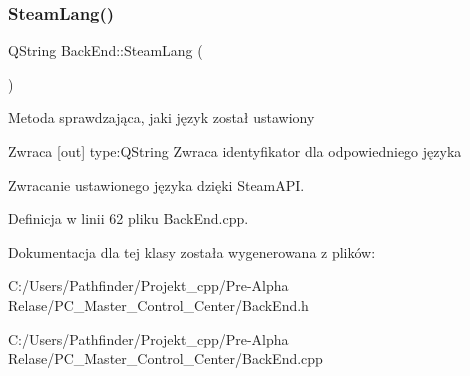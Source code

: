 \subsubsection{\texorpdfstring{Steam\+Lang()}{SteamLang()}}
{\footnotesize\ttfamily Q\+String Back\+End\+::\+Steam\+Lang (\begin{DoxyParamCaption}{ }\end{DoxyParamCaption})}

Metoda sprawdzająca, jaki język został ustawiony \begin{DoxyReturn}{Zwraca}
\mbox{[}out\mbox{]} type\+:Q\+String Zwraca identyfikator dla odpowiedniego języka 
\end{DoxyReturn}
Zwracanie ustawionego języka dzięki Steam\+A\+PI. 

Definicja w linii 62 pliku Back\+End.\+cpp.



Dokumentacja dla tej klasy została wygenerowana z plików\+:\begin{DoxyCompactItemize}
\item 
C\+:/\+Users/\+Pathfinder/\+Projekt\+\_\+cpp/\+Pre-\/\+Alpha Relase/\+P\+C\+\_\+\+Master\+\_\+\+Control\+\_\+\+Center/Back\+End.\+h\item 
C\+:/\+Users/\+Pathfinder/\+Projekt\+\_\+cpp/\+Pre-\/\+Alpha Relase/\+P\+C\+\_\+\+Master\+\_\+\+Control\+\_\+\+Center/Back\+End.\+cpp\end{DoxyCompactItemize}
